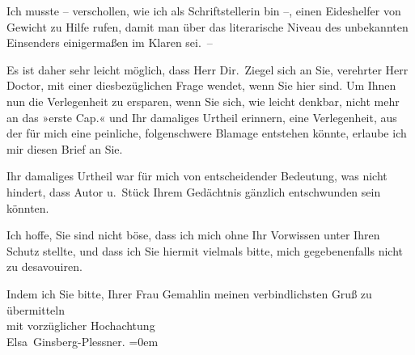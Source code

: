 \pstart
           Ich musste – verschollen, wie ich als Schriftstellerin bin –, einen Eideshelfer von
               Gewicht zu Hilfe rufen, damit man über das literarische Niveau des unbekannten
               Einsenders einigermaßen im Klaren sei. –\pend
           
\pstart
           Es ist daher sehr leicht möglich, dass Herr Dir. Ziegel sich an Sie, verehrter Herr Doctor, mit einer dies{\pb}bezüglichen Frage wendet, wenn Sie hier sind. Um Ihnen
               nun die Verlegenheit zu ersparen, wenn Sie sich, wie leicht denkbar, nicht mehr an
               das »erste Cap.« und Ihr damaliges Urtheil
               erinnern, eine Verlegenheit, aus der für mich eine peinliche, folgenschwere Blamage
               entstehen könnte, erlaube ich mir diesen Brief an Sie.\pend
           
\pstart
           Ihr damaliges Urtheil war für mich von entscheidender Bedeutung, was nicht hindert,
               dass Autor u. Stück Ihrem
               Gedächtnis gänzlich entschwunden sein könnten.\pend
           
\pstart
           Ich hoffe, Sie sind nicht böse, dass ich mich ohne Ihr Vorwissen unter Ihren Schutz
               stellte, und dass ich Sie hiermit vielmals bitte, mich gegebenenfalls nicht zu
               desavouiren.\pend
           
\pstart
           Indem ich Sie bitte, Ihrer Frau Gemahlin meinen verbindlichsten Gruß zu übermitteln{\\[\baselineskip]}mit
               vorzüglicher Hochachtung{\\[\baselineskip]}\spacefill\mbox{Elsa Ginsberg-Plessner.}\pend
           \leftskip=0em{}\endnumbering{}  \newcommand{\dateiname}{L03729}\newcommand{\titel}{Elsa Ginsberg-Plessner an Arthur Schnitzler, 15. 11. 1915}\newcommand{\editorInnen}{Selma Jahnke und Martin Anton Müller}
